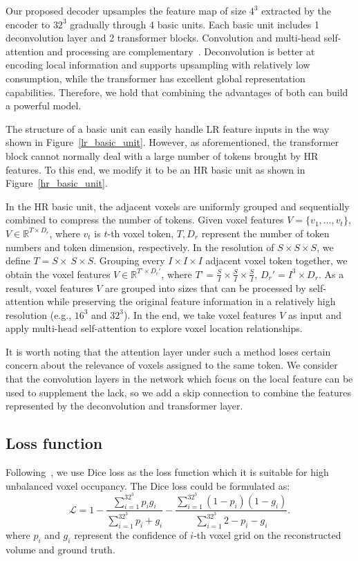 \documentclass[10pt,twocolumn,letterpaper]{article}
\newcommand{\R}{\mathbb{R}}
\begin{document}
Our proposed decoder upsamples the feature map of size $4^3$ extracted by the encoder to $32^3$ gradually through 4 basic units. Each basic unit includes 1 deconvolution layer and 2 transformer blocks. Convolution and multi-head self-attention and processing are complementary~\cite{park2022how}. Deconvolution is better at encoding local information and supports upsampling with relatively low consumption, while the transformer has excellent global representation capabilities. Therefore, we hold that combining the advantages of both can build a powerful model.

The structure of a basic unit can easily handle LR feature inputs in the way shown in Figure~\ref{lr_basic_unit}. However, as aforementioned, the transformer block cannot normally deal with a large number of tokens brought by HR features. To this end, we modify it to be an HR basic unit as shown in Figure~\ref{hr_basic_unit}.

In the HR basic unit, the adjacent voxels are uniformly grouped and sequentially combined to compress the number of tokens. Given voxel features $V=\{v_1,\ldots, v_t \}$, $V\in \R^{T\times D_r}$, where $v_t$ is $t$-th voxel token, $T, D_r$ represent the number of token numbers and token dimension, respectively. In the resolution of $S\times S\times S$, we define $T= S\times\ S \times S $. Grouping every $I\times I \times I$ adjacent voxel token together, we obtain the voxel features $V\in\R^{T’ \times {D_r}'}$, where $T’=\frac{S}{I} \times \frac{S}{I} \times \frac{S}{I}$, ${D_r}'=I^3 \times D_r$. As a result, voxel features $V$ are grouped into sizes that can be processed by self-attention while preserving the original feature information in a relatively high resolution (e.g., $16^3$ and $32^3$). In the end, we take voxel features $V$ as input and apply multi-head self-attention to explore voxel location relationships.

It is worth noting that the attention layer under such a method loses certain concern about the relevance of voxels assigned to the same token. We consider that the convolution layers in the network which focus on the local feature can be used to supplement the lack, so we add a skip connection to combine the features represented by the deconvolution and transformer layer.

\subsection{Loss function}
Following~\cite{shi20213d}, we use Dice loss \cite{milletari2016v} as the loss function which it is suitable for high unbalanced voxel occupancy. The Dice loss could be formulated as:
\begin{equation}
    \mathcal{L} = 1-\frac{\sum_{i=1}^{32^3}p_{i} g_{i}}{\sum_{i=1}^{32^3}p_{i}+g_{i}}-\frac{\sum_{i=1}^{32^3}\left(1-p_{i}\right)\left(1-g_{i}\right)}{\sum_{i=1}^{32^3}2-p_{i}-g_{i}}.
\end{equation}
where $p_i$ and $g_i$ represent the confidence of $i$-th voxel grid on the reconstructed volume and ground truth.
\end{document}
